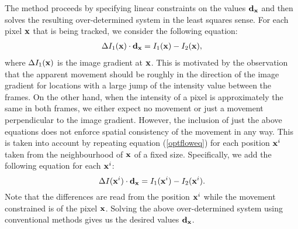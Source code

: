 The method proceeds by specifying linear constraints on the values $\mathbf{d}_{\mathbf{x}}$ and then solves the resulting over-determined system in the least squares sense. 
For each pixel $\mathbf{x}$ that is being tracked, we consider the following equation: 
\begin{align} 
\label{optfloweq} 
\Delta I_1(\mathbf{x}) \cdot \mathbf{d}_{\mathbf{x}} = I_1(\mathbf{x}) - I_2(\mathbf{x}),
\end{align} 
where $\Delta I_1(\mathbf{x})$ is the image gradient at $\mathbf{x}$.
This is motivated by the observation that the apparent movement should be roughly in the direction of the image gradient for locations with a large jump of the intensity value between the frames. 
On the other hand, when the intensity of a pixel is approximately the same in both frames, we either expect no movement or just a movement perpendicular to the image gradient.
However, the inclusion of just the above equations does not enforce spatial consistency of the movement in any way.
This is taken into account by repeating equation (\ref{optfloweq}) for each position $\mathbf{x}^i$ taken from the neighbourhood of $\mathbf{x}$ of a fixed size. 
Specifically, we add the following equation for each $\mathbf{x}^i$:
$$\Delta I(\mathbf{x}^i) \cdot \mathbf{d}_{\mathbf{x}} = I_1(\mathbf{x}^i) - I_2(\mathbf{x}^i).$$
Note that the differences are read from the position $\mathbf{x}^i$ while the movement constrained is of the pixel $\mathbf{x}$.
Solving the above over-determined system using conventional methods gives us the desired values $\mathbf{d}_{\mathbf{x}}$.

